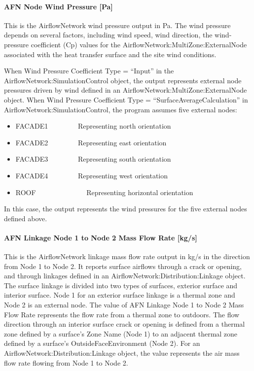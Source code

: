 \paragraph{AFN Node Wind Pressure {[}Pa{]}}\label{afn-node-wind-pressure-pa}

This is the AirflowNetwork wind pressure output in Pa. The wind pressure depends on several factors, including wind speed, wind direction, the wind-pressure coefficient (Cp) values for the AirflowNetwork:MultiZone:ExternalNode associated with the heat transfer surface and the site wind conditions.

When Wind Pressure Coefficient Type = ``Input'' in the AirflowNetwork:SimulationControl object, the output represents external node pressures driven by wind defined in an AirflowNetwork:MultiZone:ExternalNode object. When Wind Pressure Coefficient Type = ``SurfaceAverageCalculation'' in AirflowNetwork:SimulationControl, the program assumes five external nodes:

\begin{itemize}
\item
  FACADE1~~~~~~~~ Representing north orientation
\item
  FACADE2~~~~~~~~ Representing east orientation
\item
  FACADE3~~~~~~~~ Representing south orientation
\item
  FACADE4~~~~~~~~ Representing west orientation
\item
  ROOF~~~~~~~~~~~~~~ Representing horizontal orientation
\end{itemize}

In this case, the output represents the wind pressures for the five external nodes defined above.

\paragraph{AFN Linkage Node 1 to Node 2 Mass Flow Rate {[}kg/s{]}}\label{afn-linkage-node-1-to-node-2-mass-flow-rate-kgs}

This is the AirflowNetwork linkage mass flow rate output in kg/s in the direction from Node 1 to Node 2. It reports surface airflows through a crack or opening, and through linkages defined in an AirflowNetwork:Distribution:Linkage object. The surface linkage is divided into two types of surfaces, exterior surface and interior surface. Node 1 for an exterior surface linkage is a thermal zone and Node 2 is an external node. The value of AFN Linkage Node 1 to Node 2 Mass Flow Rate represents the flow rate from a thermal zone to outdoors. The flow direction through an interior surface crack or opening is defined from a thermal zone defined by a surface's Zone Name (Node 1) to an adjacent thermal zone defined by a surface's OutsideFaceEnvironment (Node 2). For an AirflowNetwork:Distribution:Linkage object, the value represents the air mass flow rate flowing from Node 1 to Node 2.

